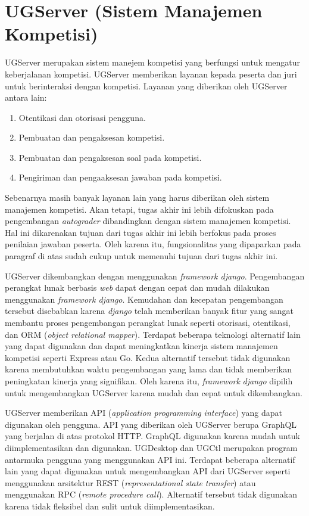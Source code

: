 \section{UGServer (Sistem Manajemen Kompetisi)}

\par UGServer merupakan sistem manejem kompetisi yang berfungsi untuk mengatur keberjalanan kompetisi. UGServer memberikan layanan kepada peserta dan juri untuk berinteraksi dengan kompetisi. Layanan yang diberikan oleh UGServer antara lain:
\begin{enumerate}
  \item Otentikasi dan otorisasi pengguna.
  \item Pembuatan dan pengaksesan kompetisi.
  \item Pembuatan dan pengaksesan soal pada kompetisi.
  \item Pengiriman dan pengaaksesan jawaban pada kompetisi.
\end{enumerate}

\par Sebenarnya masih banyak layanan lain yang harus diberikan oleh sistem manajemen kompetisi. Akan tetapi, tugas akhir ini lebih difokuskan pada pengembangan \textit{autograder} dibandingkan dengan sistem manajemen kompetisi. Hal ini dikarenakan tujuan dari tugas akhir ini lebih berfokus pada proses penilaian jawaban peserta. Oleh karena itu, fungsionalitas yang dipaparkan pada paragraf di atas sudah cukup untuk memenuhi tujuan dari tugas akhir ini.

\par UGServer dikembangkan dengan menggunakan \textit{framework django}. Pengembangan perangkat lunak berbasis \textit{web} dapat dengan cepat dan mudah dilakukan menggunakan \textit{framework django}. Kemudahan dan kecepatan pengembangan tersebut disebabkan karena \textit{django} telah memberikan banyak fitur yang sangat membantu proses pengembangan perangkat lunak seperti otorisasi, otentikasi, dan ORM (\textit{object relational mapper}). Terdapat beberapa teknologi alternatif lain yang dapat digunakan dan dapat meningkatkan kinerja sistem manajemen kompetisi seperti Express atau Go. Kedua alternatif tersebut tidak digunakan karena membutuhkan waktu pengembangan yang lama dan tidak memberikan peningkatan kinerja yang signifikan. Oleh karena itu, \textit{framework} \textit{django} dipilih untuk mengembangkan UGServer karena mudah dan cepat untuk dikembangkan.

\par UGServer memberikan API (\textit{application programming interface}) yang dapat digunakan oleh pengguna. API yang diberikan oleh UGServer berupa GraphQL yang berjalan di atas protokol HTTP. GraphQL digunakan karena mudah untuk diimplementasikan dan digunakan. UGDesktop dan UGCtl merupakan program antarmuka pengguna yang menggunakan API ini. Terdapat beberapa alternatif lain yang dapat digunakan untuk mengembangkan API dari UGServer seperti menggunakan arsitektur REST (\textit{representational state transfer}) atau menggunakan RPC (\textit{remote procedure call}). Alternatif tersebut tidak digunakan karena tidak fleksibel dan sulit untuk diimplementasikan.

